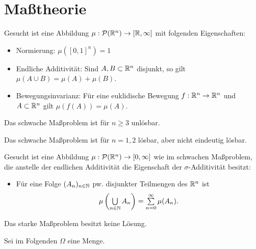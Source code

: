 \documentclass{cheat-sheet}
\newcommand{\PS}{\mathcal{P}} %
\theoremstyle{definition}
\begin{document}

\section{Maßtheorie}

\begin{prob}
  Gesucht ist eine Abbildung $\mu : \PS(\R^n) \to [\R, \infty]$ mit folgenden Eigenschaften:
  \begin{itemize}
    \item Normierung: $\mu([0, 1]^n) = 1$
    \item Endliche Additivität: Sind $A, B \subset \mathbb{R}^n$ disjunkt, so gilt $\mu(A \cup B) = \mu(A) + \mu(B)$.
    \item Bewegungsinvarianz: Für eine euklidische Bewegung $f : \mathbb{R}^n \to \mathbb{R}^n$ und $A \subset \mathbb{R}^n$ gilt $\mu(f(A)) = \mu(A)$.
  \end{itemize}
\end{prob}

\begin{satz}[Hausdorff]
  Das schwache Maßproblem ist für $n \geq 3$ unlösbar.
\end{satz}

\begin{satz}[Banach]
  Das schwache Maßproblem ist für $n = 1, 2$ lösbar, aber nicht eindeutig lösbar.
\end{satz}

\begin{prob}
  Gesucht ist eine Abbildung $\mu : \PS(\R^n) \to [0, \infty]$ wie im schwachen Maßproblem, die anstelle der endlichen Additivität die Eigenschaft der $\sigma$-Additivität besitzt:
  \begin{itemize}
    \item Für eine Folge $(A_n)_{n \in \mathbb{N}}$ pw. disjunkter Teilmengen des $\mathbb{R}^n$ ist
      \[ \mu\left(\bigcup_{n \in \N} A_n\right) = \sum_{n=0}^\infty \mu(A_n). \]
  \end{itemize}
\end{prob}

\begin{satz}
  Das starke Maßproblem besitzt keine Lösung.
\end{satz}

\begin{nota}
  Sei im Folgenden $\Omega$ eine Menge.
\end{nota}
\end{document}
